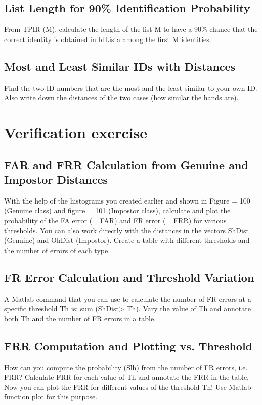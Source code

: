 \documentclass[a4paper,12pt]{article}
\begin{document}
\subsection{List Length for 90\% Identification Probability}
From TPIR (M), calculate the length of the list M to have a 90\% chance that the correct identity is obtained in IdLista among the first M identities.

\subsection{Most and Least Similar IDs with Distances}
Find the two ID numbers that are the most and the least similar to your own ID. Also write down the distances of the two cases (how similar the hands are).


\section{Verification exercise}

\subsection{FAR and FRR Calculation from Genuine and Impostor Distances}
With the help of the histograms you created earlier and shown in Figure = 100 (Genuine class) and figure = 101 (Impostor class), calculate and plot the probability of the FA error (= FAR) and FR error (= FRR) for various thresholds. You can also work directly with the distances in the vectors ShDist (Genuine) and OhDist (Impostor). Create a table with different thresholds and the number of errors of each type.

\subsection{FR Error Calculation and Threshold Variation}
A Matlab command that you can use to calculate the number of FR errors at a specific threshold Th is: sum (ShDist> Th). Vary the value of Th and annotate both Th and the number of FR errors in a table.


\subsection{FRR Computation and Plotting vs. Threshold}
How can you compute the probability (Slh) from the number of FR errors, i.e. FRR? Calculate FRR for each value of Th and annotate the FRR in the table. Now you can plot the FRR for different values of the threshold Th! Use Matlab function plot for this purpose.
\end{document}
